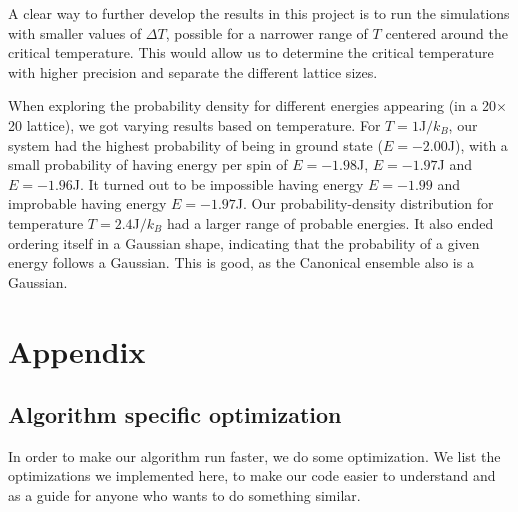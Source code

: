 \documentclass[reprint, english,notitlepage,nofootinbib]{revtex4-1}  %
\begin{document}
A clear way to further develop the results in this project is to run the simulations with smaller values of $\Delta T$, possible for a narrower range of $T$ centered around the critical temperature. This would allow us to determine the critical temperature with higher precision and separate the different lattice sizes.

When exploring the probability density for different energies appearing (in a 20$\times$20 lattice), we got varying results based on temperature. For $T=1$J$/k_B$, our system had the highest probability of being in ground state ($E = -2.00$J), with a small probability of having energy per spin of $E = -1.98$J, $E=-1.97$J and $E = -1.96$J. It turned out to be impossible having energy $E=-1.99$ and improbable having energy $E=-1.97$J. Our probability-density distribution for temperature $T=2.4$J$/k_B$ had a larger range of probable energies. It also ended ordering itself in a Gaussian shape, indicating that the probability of a given energy follows a Gaussian. This is good, as the Canonical ensemble also is a Gaussian.



\section{Appendix}
\subsection{Algorithm specific optimization}

In order to make our algorithm run faster, we do some optimization. We list the optimizations we implemented here, to make our code easier to understand and as a guide for anyone who wants to do something similar.
\end{document}
